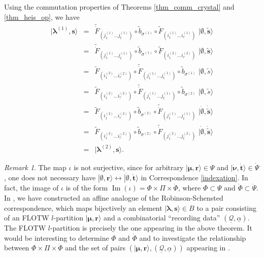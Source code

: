 \documentclass[twoside,12pt]{amsart}
\theoremstyle{plain}
\newcommand{\sQ}{\mathscr{Q}}
\newcommand{\br}{\mathbf{r}}
\newcommand{\bs}{\mathbf{s}}
\newcommand{\bt}{\mathbf{t}}
\newcommand{\al}{\alpha}
\newcommand{\si}{\sigma}
\newcommand{\la}{\lambda}
\newcommand{\bla}{\boldsymbol{\la}}
\newcommand{\bnu}{\boldsymbol{\nu}}
\newcommand{\bmu}{\boldsymbol{\mu}}
\newcommand{\tb}{\tilde{b}}
\newcommand{\ts}{\tilde{s}}
\newcommand{\tF}{\tilde{F}}
\newcommand{\dPsi}{\dot{\Psi}}
\newcommand{\dbt}{\dot{\bt}}
\newcommand{\dbnu}{\dot{\bnu}}
\newcommand{\tdF}{\tilde{\dot{F}}}
\newcommand{\tbs}{\tilde{\bs}}
\newcommand{\dtbs}{\dot{\tbs}}
\newcommand{\bemp}{\boldsymbol{\emptyset}}
\newcommand{\dbemp}{\dot{\bemp}}
\theoremstyle{remark}
\newtheorem{rem}[num]{Remark}
\begin{document}
Using the commutation properties of Theorems \ref{thm_comm_crystal} and \ref{thm_heis_op}, we have
$$
\begin{array}{rcl}
|\bla^{(1)},\bs\rangle & = & \tdF_{(j_1^{(1)} \dots j_{t}^{(1)})} \circ \tb_{\si^{(1)}} \circ \tF_{(i_1^{(1)} \dots i_{r}^{(1)})} \, \, |\bemp,\tbs\rangle \\
& = & \tdF_{(j_1^{(1)} \dots j_{t}^{(1)})} \circ \tb_{\si^{(1)}} \circ \tF_{(i_1^{(2)} \dots i_{r}^{(2)})} \, \, |\bemp,\tbs\rangle \\
& = & \tF_{(i_1^{(2)} \dots i_{r}^{(2)})} \circ \tdF_{(j_1^{(1)} \dots j_{t}^{(1)})} \circ \tb_{\si^{(1)}}   \, \, |\emptyset,\ts\rangle \\
& = & \tF_{(i_1^{(2)} \dots i_{r}^{(2)})} \circ \tdF_{(j_1^{(1)} \dots j_{t}^{(1)})} \circ \tb_{\si^{(2)}}   \, \, |\emptyset,\ts\rangle \\
& = &  \tF_{(i_1^{(2)} \dots i_{r}^{(2)})} \circ \tb_{\si^{(2)}} \circ \tdF_{(j_1^{(1)} \dots j_{t}^{(1)})}   \, \, |\dbemp,\dtbs\rangle \\
& = &  \tF_{(i_1^{(2)} \dots i_{r}^{(2)})} \circ \tb_{\si^{(2)}} \circ \tdF_{(j_1^{(2)} \dots j_{t}^{(2)})}   \, \, |\dbemp,\dtbs\rangle \\
& = & |\bla^{(2)},\bs\rangle.
\end{array}
$$
\endproof

\renewcommand{\Im}{\operatorname{Im}}

\begin{rem}\label{rem_param}
The map $\iota$ is not surjective, since for arbitrary
$|\bmu,\br\rangle\in\Psi$ and $|\dbnu,\dbt\rangle\in \dPsi$,
one does not necessary have $|\bemp,\br\rangle \longleftrightarrow |\dbemp, \dbt\rangle$ in Correspondence \ref{indexation}.
In fact, the image of $\iota$ is of the form $\Im(\iota)=\Phi\times\Pi\times\dot{\Phi}$,
where  ${\Phi}\subset\Psi$ and $\dot{\Phi}\subset\dPsi$.
In \cite[Remark 6.5]{Gerber2015}, we have constructed an affine analogue of the Robinson-Schensted correspondence,
which maps bijectively an element $|\bla,\bs\rangle\in B$ to a pair consisting of an FLOTW $l$-partition 
$|\bmu,\br\rangle$ and a combinatorial ``recording data'' $(\underline{\sQ},\underline{\al})$.
The FLOTW $l$-partition is precisely the one appearing in the above theorem.
It would be interesting to determine $\Phi$ and $\dot{\Phi}$ and to investigate the relationship
between $\Phi\times\Pi\times\dot{\Phi}$ and the set of pairs  $(|\bmu,\br\rangle , (\underline{\sQ},\underline{\al}))$ appearing in \cite{Gerber2015}.
\end{rem}
\end{document}
